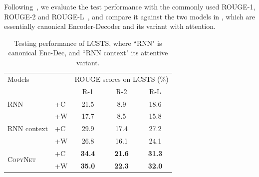 Following~\cite{hu2015lcsts}, we evaluate the test performance with the commonly used ROUGE-1, ROUGE-2 and ROUGE-L~\cite{lin:2004:ACLsummarization}, and compare it against the two models in \cite{hu2015lcsts}, which are essentially canonical Encoder-Decoder and its variant with attention.  \vspace{-5pt}
 \begin{table}[htb] %
\small
\centering
\begin{tabular}{llccc}
\toprule
 Models&& \multicolumn{3}{c}{ROUGE scores on LCSTS (\%)} \\
 && R-1 &\hspace{14pt} R-2 & R-L	\\
\midrule
RNN &  +C  & 21.5 & \hspace{14pt}8.9 & 18.6 \\
\cite{hu2015lcsts} & +W & 17.7 & \hspace{14pt}8.5 & 15.8 \\
RNN context   &  +C & 29.9 & \hspace{14pt}17.4 & 27.2 \\
\cite{hu2015lcsts} & +W & 26.8 & \hspace{14pt}16.1 & 24.1 \\
\midrule
\multirow{2}{*}{\textsc{CopyNet}}& +C & \textbf{34.4} & \hspace{14pt}\textbf{21.6} & \textbf{31.3} \\
												    & +W & \textbf{35.0} & \hspace{14pt}\textbf{22.3} & \textbf{32.0} \\												  
\bottomrule
\end{tabular} \vspace{-5pt}
\caption{\label{table-summary} Testing performance of LCSTS, where ``RNN" is canonical Enc-Dec, and ``RNN context" its attentive variant.}
\vspace{-8pt}
\end{table} 

